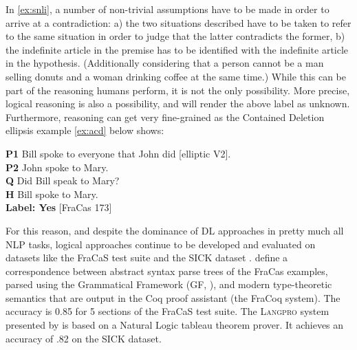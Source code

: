 \documentclass[11pt]{article}
\begin{document}
%
In \ref{ex:snli}, a number of non-trivial
assumptions have to be made in order to arrive at a contradiction: a) the two
situations described have to be taken to refer to the same situation
in order to judge that the latter  contradicts the former, b)
the indefinite article in the premise has to be identified with the
indefinite article in the hypothesis. (Additionally considering that a
person cannot be a man selling donuts and a woman drinking coffee at
the same time.) While this can be part of the reasoning humans
perform, it is not the only possibility. More precise, logical
reasoning is also a possibility, and will render the above label as unknown. Furthermore, reasoning can get very fine-grained 
as the Contained Deletion ellipsis example \ref{ex:acd} below shows:

\begin{lingex}
\item
    \label{ex:acd}
\textbf{P1}	Bill spoke to everyone that John did [elliptic V2].\\
\textbf{P2}	John spoke to Mary.\\
\textbf{Q} 	Did Bill speak to Mary?\\
\textbf{H} 	Bill spoke to Mary. \\ \textbf{Label:	Yes} [FraCas 173]
\end{lingex}



For this reason, and despite the dominance of DL approaches in pretty
much all NLP tasks, logical approaches continue to be
developed and evaluated on datasets like the FraCaS test suite and the
SICK dataset \cite{marelli:2014}.  \citet{bernardy:2017} define a
correspondence between abstract syntax parse trees of the FraCas
examples, parsed using the Grammatical Framework (GF,
\citet{Ranta:GF}), and modern type-theoretic semantics that are output
in the Coq proof assistant (the FraCoq system).  The accuracy is 0.85
for 5 sections of the FraCaS test suite. The \textsc{Langpro} system
presented by \citet{Abzianidze:2015} is based on a Natural Logic
tableau theorem prover. It achieves an accuracy of .82 on the SICK
dataset.
\end{document}
